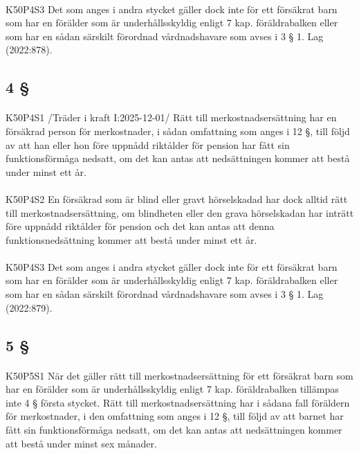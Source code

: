 \documentclass[a4paper,notitlepage,openany,10pt]{book}
\begin{document}
\paragraph*{}
{\tiny K50P4S3}
Det som anges i andra stycket gäller dock inte för ett försäkrat barn som har en förälder som är underhållsskyldig enligt 7 kap. föräldrabalken eller som har en sådan särskilt förordnad vårdnadshavare som avses i 3 § 1.
Lag (2022:878).
\subsection*{4 §}
\paragraph*{}
{\tiny K50P4S1}
/Träder i kraft I:2025-12-01/
Rätt till merkostnadsersättning har en försäkrad person för merkostnader, i sådan omfattning som anges i 12 §, till följd av att han eller hon före uppnådd riktålder för pension har fått sin funktionsförmåga nedsatt, om det kan antas att nedsättningen kommer att bestå under minst ett år.
\paragraph*{}
{\tiny K50P4S2}
En försäkrad som är blind eller gravt hörselskadad har dock alltid rätt till merkostnadsersättning, om blindheten eller den grava hörselskadan har inträtt före uppnådd riktålder för pension och det kan antas att denna funktionsnedsättning kommer att bestå under minst ett år.
\paragraph*{}
{\tiny K50P4S3}
Det som anges i andra stycket gäller dock inte för ett försäkrat barn som har en förälder som är underhållsskyldig enligt 7 kap. föräldrabalken eller som har en sådan särskilt förordnad vårdnadshavare som avses i 3 § 1.
Lag (2022:879).
\subsection*{5 §}
\paragraph*{}
{\tiny K50P5S1}
När det gäller rätt till merkostnadsersättning för ett försäkrat barn som har en förälder som är underhållsskyldig enligt 7 kap. föräldrabalken tillämpas inte 4 § första stycket. Rätt till merkostnadsersättning har i sådana fall föräldern för merkostnader, i den omfattning som anges i 12 §, till följd av att barnet har fått sin funktionsförmåga nedsatt, om det kan antas att nedsättningen kommer att bestå under minst sex månader.
\end{document}

